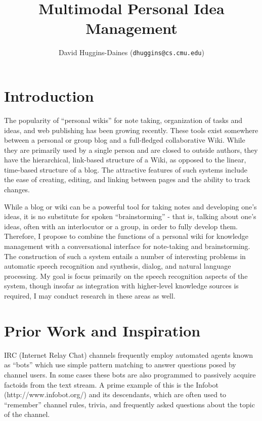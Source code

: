 \documentclass{article}
\author{David Huggins-Daines ({\tt dhuggins@cs.cmu.edu})}
\title{Multimodal Personal Idea Management}
\begin{document}
\maketitle

\section{Introduction}
\label{sec:intro}

The popularity of ``personal wikis'' for note taking, organization of
tasks and ideas, and web publishing has been growing recently.  These
tools exist somewhere between a personal or group blog and a
full-fledged collaborative Wiki.  While they are primarily used by a
single person and are closed to outside authors, they have the
hierarchical, link-based structure of a Wiki, as opposed to the
linear, time-based structure of a blog.  The attractive features of
such systems include the ease of creating, editing, and linking between
pages and the ability to track changes.

While a blog or wiki can be a powerful tool for taking notes and
developing one's ideas, it is no substitute for spoken
``brainstorming'' - that is, talking about one's ideas, often with an
interlocutor or a group, in order to fully develop them.  Therefore, I
propose to combine the functions of a personal wiki for knowledge
management with a conversational interface for note-taking and
brainstorming.  The construction of such a system entails a number of
interesting problems in automatic speech recognition and synthesis,
dialog, and natural language processing.  My goal is focus primarily
on the speech recognition aspects of the system, though insofar as
integration with higher-level knowledge sources is required, I may
conduct research in these areas as well.

\section{Prior Work and Inspiration}
\label{sec:prior}

IRC (Internet Relay Chat) channels frequently employ automated agents
known as ``bots'' which use simple pattern matching to answer
questions posed by channel users.  In some cases these bots are also
programmed to passively acquire factoids from the text stream.  A
prime example of this is the Infobot (http://www.infobot.org/) and its
descendants, which are often used to ``remember'' channel rules,
trivia, and frequently asked questions about the topic of the channel.
\end{document}
